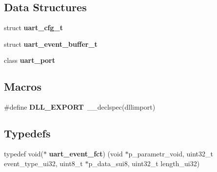 \subsection*{Data Structures}
\begin{DoxyCompactItemize}
\item 
struct \textbf{ uart\+\_\+cfg\+\_\+t}
\item 
struct \textbf{ uart\+\_\+event\+\_\+buffer\+\_\+t}
\item 
class \textbf{ uart\+\_\+port}
\end{DoxyCompactItemize}
\subsection*{Macros}
\begin{DoxyCompactItemize}
\item 
\mbox{\label{hw__dr__uart__driver__h_8h_a1ca888bd091694c05472e1b91df1a97b}} 
\#define {\bfseries D\+L\+L\+\_\+\+E\+X\+P\+O\+RT}~\+\_\+\+\_\+declspec(dllimport)
\end{DoxyCompactItemize}
\subsection*{Typedefs}
\begin{DoxyCompactItemize}
\item 
typedef void($\ast$ \textbf{ uart\+\_\+event\+\_\+fct}) (void $\ast$p\+\_\+parametr\+\_\+void, uint32\+\_\+t event\+\_\+type\+\_\+ui32, uint8\+\_\+t $\ast$p\+\_\+data\+\_\+sui8, uint32\+\_\+t length\+\_\+ui32)
\end{DoxyCompactItemize}
